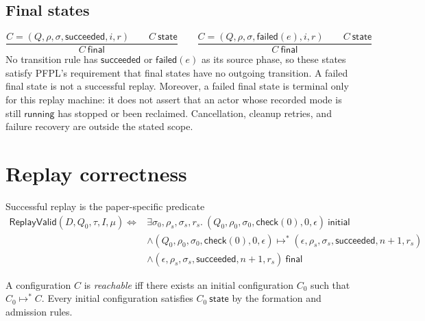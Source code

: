 \documentclass{article}
\newcommand{\Running}{\mathsf{running}}
\newcommand{\CheckPhase}{\mathsf{check}}
\newcommand{\Failed}{\mathsf{failed}}
\newcommand{\Succeeded}{\mathsf{succeeded}}
\newcommand{\ReplayValid}{\mathsf{ReplayValid}}
\begin{document}
\subsection*{Final states}
\[
\frac{
  C=(Q,\rho,\sigma,\Succeeded,i,r)\qquad C\ \mathsf{state}
}{
  C\ \mathsf{final}
}
\qquad
\frac{
  C=(Q,\rho,\sigma,\Failed(e),i,r)\qquad C\ \mathsf{state}
}{
  C\ \mathsf{final}
}
\]
No transition rule has $\Succeeded$ or $\Failed(e)$ as its source phase, so
these states satisfy PFPL's requirement that final states have no outgoing
transition. A failed final state is not a successful replay. Moreover, a
failed final state is terminal only for this replay machine: it does not
assert that an actor whose recorded mode is still $\Running$ has stopped or
been reclaimed. Cancellation, cleanup retries, and failure recovery are
outside the stated scope.

\section{Replay correctness}

Successful replay is the paper-specific predicate
\[
\begin{aligned}
  \ReplayValid(D,Q_0,\tau,I,\mu)
  \iff{}&\exists \sigma_0,\rho_s,\sigma_s,r_s.\
    (Q_0,\rho_0,\sigma_0,\CheckPhase(0),0,\epsilon)\ \mathsf{initial}\\
    &\land (Q_0,\rho_0,\sigma_0,\CheckPhase(0),0,\epsilon)
      \longmapsto^{*}
      (\epsilon,\rho_s,\sigma_s,\Succeeded,n+1,r_s)\\
    &\land (\epsilon,\rho_s,\sigma_s,\Succeeded,n+1,r_s)\ \mathsf{final}
\end{aligned}
\]

A configuration $C$ is \emph{reachable} iff there exists an initial
configuration $C_0$ such that $C_0\longmapsto^{*}C$. Every initial
configuration satisfies $C_0\ \mathsf{state}$ by the formation and admission
rules.
\end{document}
